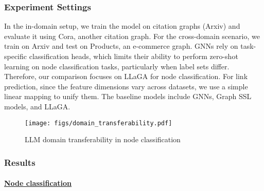 \subsubsection{Experiment Settings}
In the in-domain setup, we train the model on citation graphs (Arxiv) and evaluate it using Cora, another citation graph. For the cross-domain scenario, we train on Arxiv and test on Products, an e-commerce graph. GNNs rely on task-specific classification heads, which limits their ability to perform zero-shot learning on node classification tasks, particularly when label sets differ. Therefore, our comparison focuses on LLaGA for node classification. For link prediction, since the feature dimensions vary across datasets, we use a simple linear mapping to unify them. The baseline models include GNNs, Graph SSL models, and LLaGA.

\begin{figure}[htbp]
  \centering
  \texttt{[image: figs/domain\_transferability.pdf]}
  \caption{LLM domain transferability in node classification}
  \label{fig:Domain Transferability}
\end{figure}

\subsubsection{Results}
\paragraph{\underline{Node classification}}

